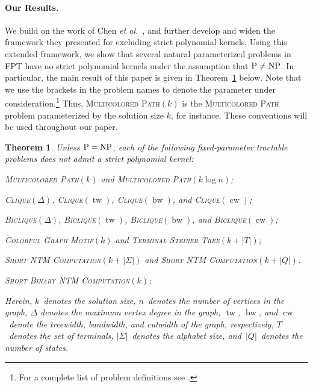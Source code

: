 \documentclass[11pt,a4,USenglish]{article}
\newcommand{\prob}[1]{\textsc{#1}}
\newcommand{\pprob}[2]{\prob{#1}$(#2)$}
\newcommand{\NP}{\textnormal{NP}}
\newcommand{\PTIME}{\textnormal{P}}
\newcommand{\FPT}{\textnormal{FPT}}
\newcommand{\PnotNP}{$\PTIME{}\neq\NP{}$}
\newcommand{\PeqNP}{$\PTIME{}=\NP{}$}
\DeclareMathOperator{\tw}{tw}
\DeclareMathOperator{\bw}{bw}
\DeclareMathOperator{\cw}{cw}
\theoremstyle{definition}
\theoremstyle{plain}
\newtheorem{thm}{Theorem}
\theoremstyle{remark}
\newcommand{\noproof}{}
\begin{document}
\paragraph{Our Results.}
We build on the work of Chen \emph{et al.}~\cite{chen2011lower}, and further develop and widen the framework they presented for excluding strict polynomial kernels. Using this extended framework, we show that several natural parameterized problems in \FPT{} have no strict polynomial kernels under the assumption that \PnotNP{}. 
In particular, the main result of this paper is given in Theorem~\ref{thm:main} below. 
Note that we use the brackets in the problem names to denote the parameter under consideration.\footnote{For a complete list of problem definitions see .} 
Thus, \pprob{Multicolored Path}{k} is the \prob{Multicolored Path} problem parameterized by the solution size $k$, for instance. %
These conventions will be used throughout our paper. 
%
\begin{thm}
\label{thm:main}%
%
Unless \PeqNP{}, each of the following fixed-parameter tractable problems does not admit a strict polynomial kernel:
%
\begin{compactitem}
\item \pprob{Multicolored Path}{k} and \pprob{Multicolored Path}{k \log n};
\item \pprob{Clique}{\Delta}\noproof{}, \pprob{Clique}{\tw}\noproof{}, \pprob{Clique}{\bw}\noproof{}, and \pprob{Clique}{\cw};
\item \pprob{Biclique}{\Delta}\noproof{}, \pprob{Biclique}{\tw}\noproof{}, \pprob{Biclique}{\bw}\noproof{}, and \pprob{Biclique}{\cw}\noproof{};
%
%
%
%
\item \pprob{Colorful Graph Motif}{k} and \pprob{Terminal Steiner Tree}{k+|T|}\noproof{};%
%
%
%
%
%
%
\item \pprob{Short NTM Computation}{k+|\Sigma|} and \pprob{Short NTM Computation}{k+|Q|}.
\item \pprob{Short Binary NTM Computation}{k}\noproof{};
\end{compactitem}
%
Herein, $k$~denotes the solution size, $n$~denotes the number of vertices 
in the graph, %
$\Delta$ denotes the maximum vertex degree in the graph, 
$\tw$, $\bw$, and $\cw$~denote the treewidth, bandwidth, and cutwidth of the graph, respectively, 
$T$~denotes the set of terminals,
%
$|\Sigma |$~denotes the alphabet size, and~$|Q|$~denotes the number of states.
\end{thm}
\end{document}
